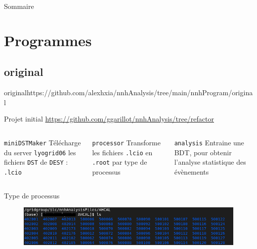 \documentclass[9pt]{beamer}
\begin{document}

\begin{frame}{Sommaire}
	\tableofcontents
\end{frame}

\section{Programmes}

\subsection{original}

\begin{frame}{original}{https://github.com/alexhxia/nnhAnalysis/tree/main/nnhProgram/original}

\begin{block}{Projet initial}
	\url{https://github.com/ggarillot/nnhAnalysis/tree/refactor}
\end{block}

\begin{columns}

	\begin{column}{0.33\textwidth}
		\begin{block}{\texttt{miniDSTMaker}}
			Télécharge du server \texttt{lyogrid06} les fichiers \texttt{DST} de \texttt{DESY} : \texttt{.lcio}
		\end{block}
	\end{column}
	
	\begin{column}{0.33\textwidth}
		\begin{block}{\texttt{processor}}
			Transforme les fichiers \texttt{.lcio} en \texttt{.root} par type de processus
		\end{block}
	\end{column}
	
	\begin{column}{0.33\textwidth}
		\begin{block}{\texttt{analysis}}
			Entraine une BDT, pour obtenir l'analyse statistique des évènements
		\end{block}
	\end{column}

\end{columns}

\begin{block}{Type de processus}
	\begin{figure}
		\center
		\includegraphics[width=\textwidth]{../img/listeProcessus.png} 
	\end{figure}
\end{block}

\end{frame}
\end{document}

